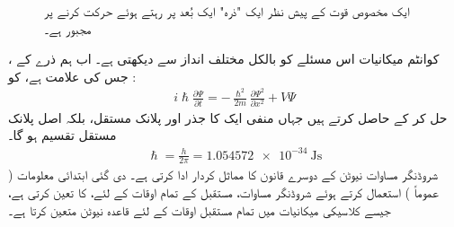  \begin{figure}
 \centering
 \caption{ایک مخصوص قوت کے پیش نظر ایک "ذرہ" ایک بُعد پر رہتے ہوئے حرکت کرنے پر مجبور ہے۔}
 \label{شکل_تفاعل_موج_حرکت_یک_بعدی}
 \end{figure}
کوانٹم میکانیات اس مسئلے کو بالکل مختلف انداز سے  دیکھتی  ہے۔ اب ہم ذرے کے  ،  جس کی علامت  ہے،   کو :
\begin{align}\label{مساوات_تفاعل_موج_شروڈنگر_الف}
 i \hslash \frac{\partial \Psi}{\partial t} = - \frac{\hslash^{2}}{2m} \frac{\partial \Psi^{2}}{\partial x^{2}} + V \Psi
\end{align}
حل کر کے حاصل کرتے ہیں جہاں    منفی ایک  کا جذر  اور   پلانک  مستقل، بلکہ اصل پلانک مستقل تقسیم     ہو گا۔
\begin{align}
 \hslash = \frac{h}{2\pi} = \SI{1.054572e-34}{\joule\second} 
\end{align}
شروڈنگر  مساوات نیوٹن کے دوسرے قانون کا مماثل کردار ادا کرتی ہے۔ دی گئی ابتدائی معلومات ( عموماً  )   استعمال کرتے ہوئے  شروڈنگر مساوات،  مستقبل کے تمام اوقات کے لئے،  کا  تعین کرتی ہے، جیسے  کلاسیکی میکانیات میں تمام مستقبل اوقات کے لئے  قاعدہ نیوٹن    متعین کرتا ہے۔ 
 

